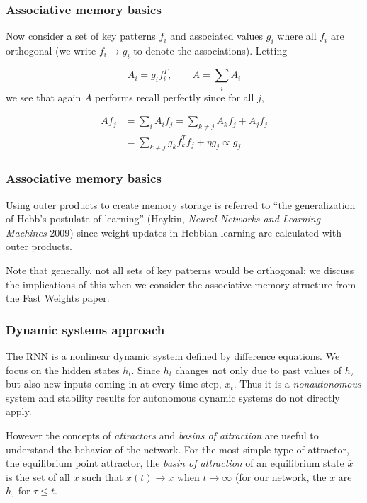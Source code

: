 \documentclass{beamer}
\begin{document}
\begin{frame}
  \frametitle{Associative memory basics}
Now consider a set of key patterns $f_i$ and associated values $g_i$ where all $f_i$ are orthogonal (we write $f_i \rightarrow g_i$ to denote the associations). Letting

\begin{equation*}
A_i = g_i f_i^T, \qquad A = \sum_{i} A_i
\end{equation*}
%
we see that again $A$ performs recall perfectly since for all $j$,

\begin{align*}
  A f_j & = \sum_{i}A_i f_j = \sum_{k \neq j} A_k f_j + A_j f_j \\
  & = \sum_{k \neq j} g_k f_k^T f_j + \eta g_j \propto g_j
\end{align*}
%
\end{frame}

\begin{frame}
  \frametitle{Associative memory basics}
  Using outer products to create memory storage is referred to ``the generalization of Hebb's postulate of learning'' (Haykin, \emph{Neural Networks and Learning Machines} 2009) since weight updates in Hebbian learning are calculated with outer products.

  \vspace{0.5cm}

  Note that generally, not all sets of key patterns would be orthogonal; we discuss the implications of this when we consider the associative memory structure from the Fast Weights paper.
\end{frame}

\begin{frame}
  \frametitle{Dynamic systems approach}
  The RNN is a nonlinear dynamic system defined by difference equations. We focus on the hidden states $h_t$. Since $h_t$ changes not only due to past values of $h_\tau$ but also new inputs coming in at every time step, $x_t$. Thus it is a \emph{nonautonomous} system and stability results for autonomous dynamic systems do not directly apply.

  \vspace{0.5cm}

  However the concepts of \emph{attractors} and \emph{basins of attraction} are useful to understand the behavior of the network. For the most simple type of attractor, the equilibrium point attractor, the \emph{basin of attraction} of an equilibrium state $\overline{x}$ is the set of all $x$ such that $x(t) \to \overline{x}$ when $t \to \infty$ (for our network, the $x$ are $h_\tau$ for $\tau \leq t$.
\end{frame}
\end{document}
